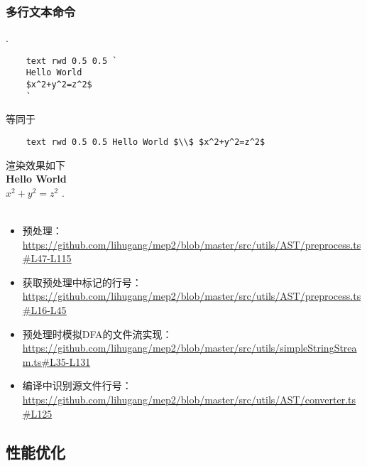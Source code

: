 \subsubsection{多行文本命令}
.\\
\begin{lstlisting}
    text rwd 0.5 0.5 `
    Hello World
    $x^2+y^2=z^2$
    `
\end{lstlisting}
等同于
\begin{lstlisting}
    text rwd 0.5 0.5 Hello World $\\$ $x^2+y^2=z^2$
\end{lstlisting}
渲染效果如下\\
\textbf{Hello World \\ $x^2+y^2=z^2$}
.\\\\

\begin{itemize}
    \item 预处理：\url{https://github.com/lihugang/mep2/blob/master/src/utils/AST/preprocess.ts#L47-L115}
    \item 获取预处理中标记的行号：\url{https://github.com/lihugang/mep2/blob/master/src/utils/AST/preprocess.ts#L16-L45}
    \item 预处理时模拟DFA的文件流实现：\url{https://github.com/lihugang/mep2/blob/master/src/utils/simpleStringStream.ts#L35-L131}
    \item 编译中识别源文件行号：\url{https://github.com/lihugang/mep2/blob/master/src/utils/AST/converter.ts#L125}
\end{itemize}

\subsection{性能优化}
